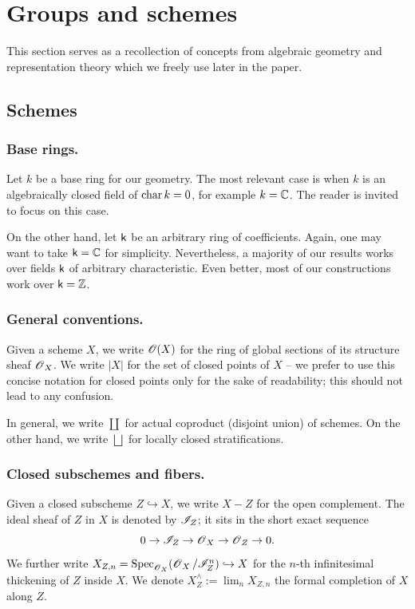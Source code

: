 \section{Groups and schemes}\label{section: groups and schemes}
This section serves as a recollection of concepts from algebraic geometry and representation theory which we freely use later in the paper.

\subsection{Schemes}

\subsubsection{Base rings.}
Let $k$ be a base ring for our geometry. The most relevant case is when $k$ is an algebraically closed field of $\operatorname{char} k = 0$, for example $k=\operatorname{\mathbb{C}}$. The reader is invited to focus on this case.

On the other hand, let $\mathsf{k}$ be an arbitrary ring of coefficients. Again, one may want to take $\mathsf{k} =\operatorname{\mathbb{C}}$ for simplicity. Nevertheless, a majority of our results works over fields $\mathsf{k}$ of arbitrary characteristic. Even better, most of our constructions work over $\mathsf{k} = \operatorname{\mathbb{Z}}$.  


\subsubsection{General conventions.}
Given a scheme $X$, we write $\operatorname{\mathscr{O}}(X)$ for the ring of global sections of its structure sheaf $\operatorname{\mathscr{O}}_X$.
We write $|X|$ for the set of closed points of $X$ -- we prefer to use this concise notation for closed points only for the sake of readability; this should not lead to any confusion.


In general, we write $\coprod$ for actual coproduct (disjoint union) of schemes. On the other hand, we write $\bigsqcup$ for locally closed stratifications.

\subsubsection{Closed subschemes and fibers.}
Given a closed subscheme $Z \hookrightarrow X$, we write $X - Z$ for the open complement. The ideal sheaf of $Z$ in $X$ is denoted by $\mathscr{I}_{Z}$; it sits in the short exact sequence
\begin{equation*}
    0 \to \mathscr{I}_{Z} \to \operatorname{\mathscr{O}}_X \to \operatorname{\mathscr{O}}_Z \to 0.
\end{equation*}
We further write $X_{Z, n} = {\operatorname{Spec}}_{\operatorname{\mathscr{O}}_X}(\operatorname{\mathscr{O}}_X / \mathscr{I}^n_Z) \hookrightarrow X$ for the $n$-th infinitesimal thickening of $Z$ inside $X$. We denote $X^{\wedge}_Z := \lim_{n} X_{Z, n}$ the formal completion of $X$ along $Z$.


